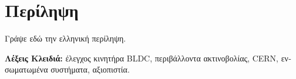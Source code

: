 \chapter*{Περίληψη}

\begin{greek}
Γράψε εδώ την ελληνική περίληψη.

\vspace{1em}

\textbf{Λέξεις Κλειδιά:} έλεγχος κινητήρα BLDC, περιβάλλοντα ακτινοβολίας, CERN, ενσωματωμένα συστήματα, αξιοπιστία.
\end{greek}